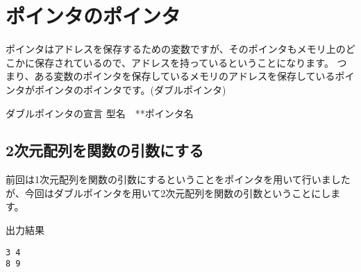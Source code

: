 ﻿\section{ポインタのポインタ}
ポインタはアドレスを保存するための変数ですが、そのポインタもメモリ上のどこかに保存されているので、アドレスを持っているということになります。
つまり、ある変数のポインタを保存しているメモリのアドレスを保存しているポインタがポインタのポインタです。(ダブルポインタ)
\begin{itembox}{ダブルポインタの宣言}
型名　**ポインタ名
\end{itembox}

\subsection{2次元配列を関数の引数にする}
前回は1次元配列を関数の引数にするということをポインタを用いて行いましたが、今回はダブルポインタを用いて2次元配列を関数の引数ということにします。



\begin{itembox}{出力結果}
\begin{verbatim}
3 4
8 9
\end{verbatim}
\end{itembox}


